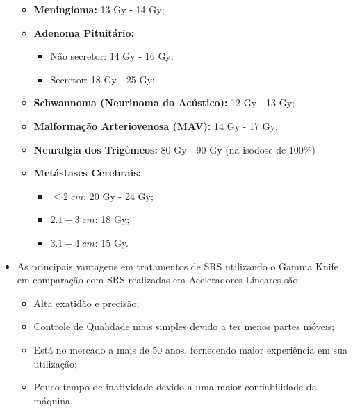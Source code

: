 \documentclass[11pt,a4paper]{article}
\newcounter{exemplo}
\begin{document}
\begin{exemplo}
\begin{itemize}
            \begin{itemize}[label=\textcolor{CarnationPink}{$\blacktriangleright$}]
                \item \textbf{Meningioma:} 13 Gy - 14 Gy;
                \item \textbf{Adenoma Pituitário:}
                    \begin{itemize}[label=\textcolor{CarnationPink}{$\star$}]
                        \item Não secretor: 14 Gy - 16 Gy;
                        \item Secretor: 18 Gy - 25 Gy;
                    \end{itemize}
                \item \textbf{Schwannoma (Neurinoma do Acústico):} 12 Gy - 13 Gy;
                \item \textbf{Malformação Arteriovenosa (MAV):} 14 Gy - 17 Gy;
                \item \textbf{Neuralgia dos Trigêmeos: } 80 Gy - 90 Gy (na isodose de 100\%)
                \item \textbf{Metástases Cerebrais:}
                    \begin{itemize}[label=\textcolor{CarnationPink}{$\star$}]
                        \item $\leq 2 \; cm$: 20 Gy - 24 Gy;
                        \item $2.1 - 3 \; cm$: 18 Gy;
                        \item $3.1 - 4 \; cm$: 15 Gy.
                    \end{itemize}
            \end{itemize}

        \item As principais vantagens em tratamentos de SRS utilizando o Gamma Knife em comparação com SRS realizadas em Aceleradores Lineares são:
        
            \begin{itemize}[label=\textcolor{CarnationPink}{$\blacktriangleright$}]
                \item Alta exatidão e precisão;
                \item Controle de Qualidade mais simples devido a ter menos partes móveis;
                \item Está no mercado a mais de 50 anos, fornecendo maior experiência em sua utilização;
                \item Pouco tempo de inatividade devido a uma maior confiabilidade da máquina.
            \end{itemize}


\end{itemize}
\end{exemplo}
\end{document}
